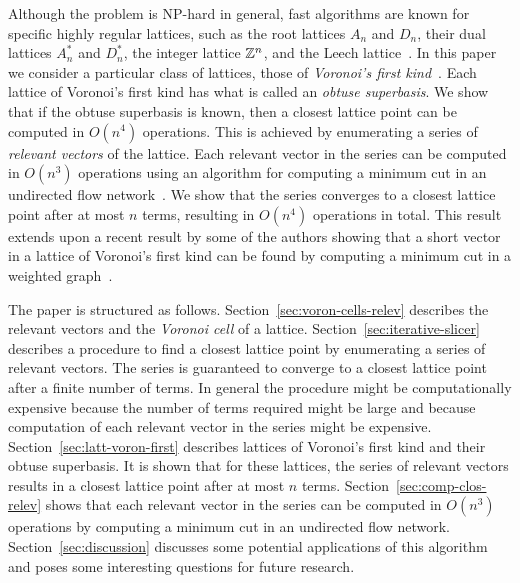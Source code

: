 \documentclass[final,leqno]{siamltex}
\begin{document}
Although the problem is NP-hard in general, fast algorithms are known for specific highly regular lattices, such as the root lattices $A_n$ and $D_n$, their dual lattices $A_n^*$ and $D_n^*$, the integer lattice ${\mathbb Z}^{n}$, and the Leech lattice~\cite[Chap. 4]{SPLAG}\cite{Conway1982FastQuantDec,Conway1986SoftDecLeechGolay, Clarkson1999:Anstar, McKilliam2008, McKilliam2008b, McKilliam2009CoxeterLattices,Vardy1993_leech_lattice_MLD}.  In this paper we consider a particular class of lattices, those of \emph{Voronoi's first kind}~\cite{ConwaySloane1992_voronoi_lattice_3d_obtuse_superbases,Valentin2003_coverings_tilings_low_dimension,Voronoi1908_main_paper}.  Each lattice of Voronoi's first kind has what is called an \emph{obtuse superbasis}.  We show that if the obtuse superbasis is known, then a closest lattice point can be computed in $O(n^4)$ operations.  This is achieved by enumerating a series of \emph{relevant vectors} of the lattice.  Each relevant vector in the series can be computed in $O(n^3)$ operations using an algorithm for computing a minimum cut in an undirected flow network~\cite{Picard_min_cuts_1974,Sankaran_solving_CDMA_mincut_1998,Ulukus_cdma_mincut_1998,Cormen2001}.  We show that the series converges to a closest lattice point after at most $n$ terms, resulting in $O(n^4)$ operations in total.  This result extends upon a recent result by some of the authors showing that a short vector in a lattice of Voronoi's first kind can be found by computing a minimum cut in a weighted graph~\cite{McKilliam_short_vectors_first_type_isit_2012}.

The paper is structured as follows.  Section~\ref{sec:voron-cells-relev} describes the relevant vectors and the \emph{Voronoi cell} of a lattice. Section~\ref{sec:iterative-slicer} describes a procedure to find a closest lattice point by enumerating a series of relevant vectors.  The series is guaranteed to converge to a closest lattice point after a finite number of terms.  In general the procedure might be computationally expensive because the number of terms required might be large and because computation of each relevant vector in the series might be expensive.  Section~\ref{sec:latt-voron-first} describes lattices of Voronoi's first kind and their obtuse superbasis.  It is shown that for these lattices, the series of relevant vectors results in a closest lattice point after at most $n$ terms.  Section~\ref{sec:comp-clos-relev} shows that each relevant vector in the series can be computed in $O(n^3)$ operations by computing a minimum cut in an undirected flow network.  Section~\ref{sec:discussion} discusses some potential applications of this algorithm and poses some interesting questions for future research.
\end{document}
